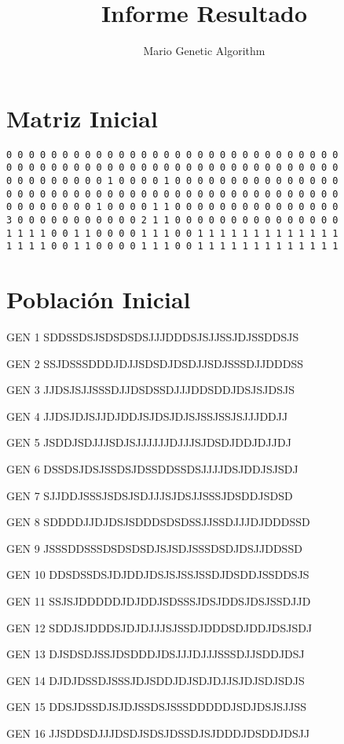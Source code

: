 \documentclass[a4paper,12pt]{article}
\title{\textbf{Informe Resultado}}
\author{Mario Genetic Algorithm}
\date{}
\begin{document}
\maketitle

\section*{Matriz Inicial}
\begin{verbatim}
0 0 0 0 0 0 0 0 0 0 0 0 0 0 0 0 0 0 0 0 0 0 0 0 0 0 0 0 0 0
0 0 0 0 0 0 0 0 0 0 0 0 0 0 0 0 0 0 0 0 0 0 0 0 0 0 0 0 0 0
0 0 0 0 0 0 0 0 0 1 0 0 0 0 1 0 0 0 0 0 0 0 0 0 0 0 0 0 0 0
0 0 0 0 0 0 0 0 0 0 0 0 0 0 0 0 0 0 0 0 0 0 0 0 0 0 0 0 0 0
0 0 0 0 0 0 0 0 1 0 0 0 0 1 1 0 0 0 0 0 0 0 0 0 0 0 0 0 0 0
3 0 0 0 0 0 0 0 0 0 0 0 2 1 1 0 0 0 0 0 0 0 0 0 0 0 0 0 0 0
1 1 1 1 0 0 1 1 0 0 0 0 1 1 1 0 0 1 1 1 1 1 1 1 1 1 1 1 1 1
1 1 1 1 0 0 1 1 0 0 0 0 1 1 1 0 0 1 1 1 1 1 1 1 1 1 1 1 1 1
\end{verbatim}

\section*{Población Inicial}
GEN 1 SDDSSDSJSDSDSDSJJJDDDSJSJJSSJDJSSDDSJS

GEN 2 SSJDSSSDDDJDJJSDSDJDSDJJSDJSSSDJJDDDSS

GEN 3 JJDSJSJJSSSDJJDSDSSDJJJDDSDDJDSJSJDSJS

GEN 4 JJDSJDJSJJDJDDJSJDSJDJSJSSJSSJSJJJDDJJ

GEN 5 JSDDJSDJJJSDJSJJJJJJDJJJSJDSDJDDJDJJDJ

GEN 6 DSSDSJDSJSSDSJDSSDDSSDSJJJJDSJDDJSJSDJ

GEN 7 SJJDDJSSSJSDSJSDJJJSJDSJJSSSJDSDDJSDSD

GEN 8 SDDDDJJDJDSJSDDDSDSDSSJJSSDJJJDJDDDSSD

GEN 9 JSSSDDSSSDSDSDSDJSJSDJSSSDSDJDSJJDDSSD

GEN 10 DDSDSSDSJDJDDJDSJSJSSJSSDJDSDDJSSDDSJS

GEN 11 SSJSJDDDDDJDJDDJSDSSSJDSJDDSJDSJSSDJJD

GEN 12 SDDJSJDDDSJDJDJJJSJSSDJDDDSDJDDJDSJSDJ

GEN 13 DJSDSDJSSJDSDDDJDSJJJDJJJSSSDJJSDDJDSJ

GEN 14 DJDJDSSDJSSSJDJSDDJDJSDJDJJSJDJSDJSDJS

GEN 15 DDSJDSSDJSJDJSSDSJSSSDDDDDJSDJDSJSJJSS

GEN 16 JJSDDSDJJJDSDJSDSJDSSDJSJDDDJDSDDJDSJJ
\end{document}
